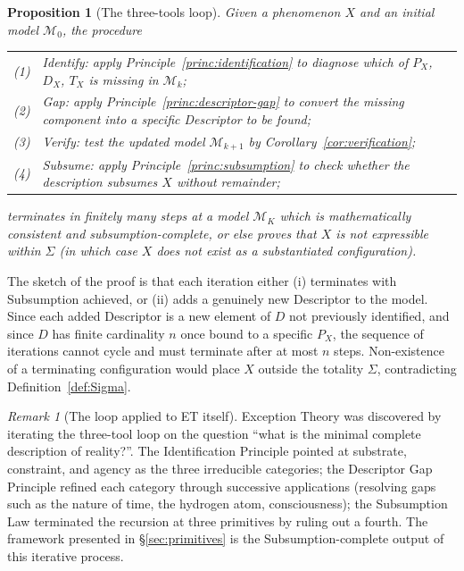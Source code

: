 \documentclass[11pt,a4paper]{article}
\newtheorem{proposition}[theorem]{Proposition}
\theoremstyle{definition}
\theoremstyle{remark}
\newtheorem{remark}[theorem]{Remark}
\begin{document}
\begin{proposition}[The three-tools loop]\label{prop:loop}
Given a phenomenon $X$ and an initial model $\mathcal{M}_{0}$, the procedure
\begin{center}
\begin{tabularx}{\textwidth}{rX}
(1) & Identify: apply Principle~\ref{princ:identification} to diagnose which of $P_{X}$, $D_{X}$, $T_{X}$ is missing in $\mathcal{M}_{k}$;\\
(2) & Gap: apply Principle~\ref{princ:descriptor-gap} to convert the missing component into a specific Descriptor to be found;\\
(3) & Verify: test the updated model $\mathcal{M}_{k+1}$ by Corollary~\ref{cor:verification};\\
(4) & Subsume: apply Principle~\ref{princ:subsumption} to check whether the description subsumes $X$ without remainder;
\end{tabularx}
\end{center}
terminates in finitely many steps at a model $\mathcal{M}_{K}$ which is mathematically consistent and subsumption-complete, or else proves that $X$ is not expressible within $\Sigma$ (in which case $X$ does not exist as a substantiated configuration).
\end{proposition}

The sketch of the proof is that each iteration either (i) terminates with Subsumption achieved, or (ii) adds a genuinely new Descriptor to the model. Since each added Descriptor is a new element of $D$ not previously identified, and since $D$ has finite cardinality $n$ once bound to a specific $P_{X}$, the sequence of iterations cannot cycle and must terminate after at most $n$ steps. Non-existence of a terminating configuration would place $X$ outside the totality $\Sigma$, contradicting Definition~\ref{def:Sigma}.

\begin{remark}[The loop applied to ET itself]
Exception Theory was discovered by iterating the three-tool loop on the question ``what is the minimal complete description of reality?''. The Identification Principle pointed at substrate, constraint, and agency as the three irreducible categories; the Descriptor Gap Principle refined each category through successive applications (resolving gaps such as the nature of time, the hydrogen atom, consciousness); the Subsumption Law terminated the recursion at three primitives by ruling out a fourth. The framework presented in \S\ref{sec:primitives} is the Subsumption-complete output of this iterative process.
\end{remark}
\end{document}
